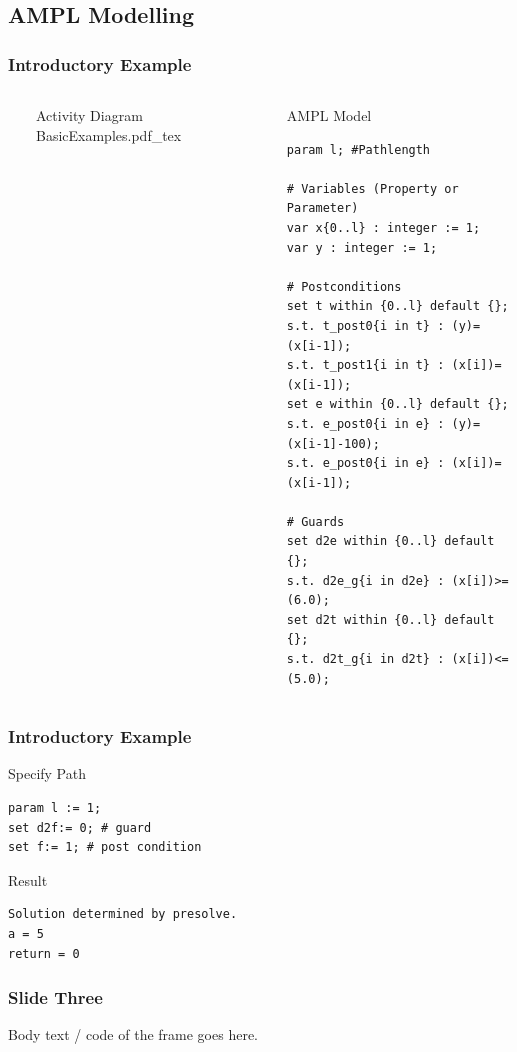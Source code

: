 \documentclass{beamer}
\begin{document}
\subsection{AMPL Modelling}
\begin{frame}[fragile]
\frametitle{Introductory Example}
\begin{columns}
  \ 
	\begin{block}{Activity Diagram} 
	\def\svgwidth{\textwidth}
	\scriptsize
	{BasicExamples.pdf_tex}
	\end{block} 
\column{.56\textwidth} \ 
	\begin{block}{AMPL Model} 
		\begin{lstlisting}[basicstyle=\ttfamily\scriptsize,language=ampl]
param l; #Pathlength

# Variables (Property or Parameter)
var x{0..l} : integer := 1;
var y : integer := 1;

# Postconditions
set t within {0..l} default {};
s.t. t_post0{i in t} : (y)=(x[i-1]);
s.t. t_post1{i in t} : (x[i])=(x[i-1]);
set e within {0..l} default {};
s.t. e_post0{i in e} : (y)=(x[i-1]-100);
s.t. e_post0{i in e} : (x[i])=(x[i-1]);

# Guards
set d2e within {0..l} default {};
s.t. d2e_g{i in d2e} : (x[i])>=(6.0);
set d2t within {0..l} default {};
s.t. d2t_g{i in d2t} : (x[i])<=(5.0);
\end{lstlisting}
	\end{block} 
\end{columns}
\end{frame}

\begin{frame}[fragile]
\frametitle{Introductory Example}
	\begin{block}{Specify Path} 
		\begin{lstlisting}[basicstyle=\ttfamily\small,language=ampl]
param l := 1;
set d2f:= 0; # guard 
set f:= 1; # post condition
		\end{lstlisting}
	\end{block} 
	\begin{block}{Result} 
		\begin{lstlisting}[basicstyle=\ttfamily\small]
Solution determined by presolve.
a = 5
return = 0
		\end{lstlisting}
	\end{block}
\end{frame}

\begin{frame}
\frametitle{Slide Three} 
Body text / code of the frame goes here. 
\end{frame} 
\end{document}
